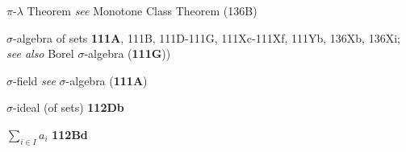 $\pi$-$\lambda$ Theorem {\it see} Monotone Class Theorem (136B)

\indexmedskip





\indexmedskip
\indexheader{$\scriptstyle\pmb{\sigma}$}







$\sigma$-algebra of sets {\bf 111A}, 111B,
111D-111G, 
111Xc-111Xf, 
111Yb, 136Xb, 136Xi; 
  {\it see also}
Borel $\sigma$-algebra ({\bf 111G}))
















$\sigma$-field {\it see} $\sigma$-algebra ({\bf 111A})















{$\sigma$-ideal }
(of sets) {\bf 112Db}

























\indexmedskip
\indexheader{$\scriptstyle\pmb{\Sigma}$}







$\sum_{i\in I}a_i$ {\bf 112Bd}





































